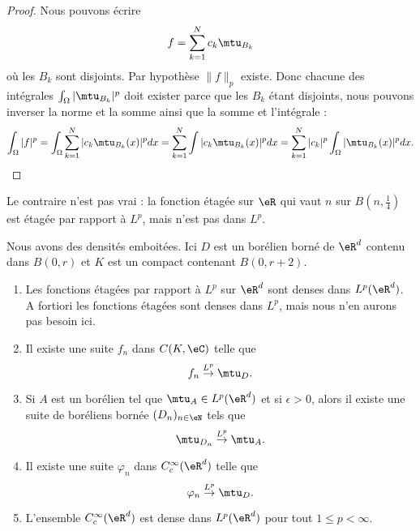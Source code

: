 \begin{proof}
    Nous pouvons écrire
    \begin{equation}
        f=\sum_{k=1}^Nc_k\mtu_{B_k}
    \end{equation}
    où les \( B_k\) sont disjoints. Par hypothèse \( \| f \|_p\) existe. Donc chacune des intégrales \( \int_{\Omega}| \mtu_{B_k} |^p\) doit exister parce que les \( B_k\) étant disjoints, nous pouvons inverser la norme et la somme ainsi que la somme et l'intégrale :
    \begin{equation}
        \int_{\Omega}|f|^p=\int_{\Omega}\sum_{k=1}^N| c_k\mtu_{B_k}(x) |^pdx=\sum_{k=1}^N\int| c_k\mtu_{B_k}(x) |^pdx=\sum_{k=1}^N| c_k |^p\int_{\Omega}| \mtu_{B_k}(x) |^pdx.
    \end{equation}
\end{proof}
Le contraire n'est pas vrai : la fonction étagée sur \( \eR\) qui vaut \( n\) sur \( B(n,\frac{1}{ 4 })\) est étagée par rapport à \( L^p\), mais n'est pas dans \( L^p\).

\begin{theorem} \label{ThoILGYXhX}
    Nous avons des densités emboitées. Ici \( D\) est un borélien borné de \( \eR^d\) contenu dans \( B(0,r)\) et \( K\) est un compact contenant \( B(0,r+2)\).
    \begin{enumerate}
        \item
            Les fonctions étagées par rapport à \( L^p\) sur \( \eR^d\) sont denses dans \( L^p(\eR^d)\). A fortiori les fonctions étagées sont denses dans \( L^p\), mais nous n'en aurons pas besoin ici.
        \item\label{ItemYVFVrOIii}
            Il existe une suite \( f_n\) dans \(  C(K,\eC)\) telle que 
            \begin{equation}
                f_n\stackrel{L^p}{\to}\mtu_{D}.
            \end{equation}
        \item\label{ItemYVFVrOIiii}
            Si \( A\) est un borélien tel que \( \mtu_A\in L^p(\eR^d)\) et si \( \epsilon>0\), alors il existe une suite de boréliens bornée \( (D_n)_{n\in \eN}\) tels que
            \begin{equation}
                \mtu_{D_n}\stackrel{L^p}{\to}\mtu_A.
            \end{equation}
        \item\label{ItemYVFVrOIiv}
            Il existe une suite \( \varphi_n\) dans \(  C^{\infty}_c(\eR^d)\) telle que 
            \begin{equation}
                \varphi_n\stackrel{L^p}{\to}\mtu_{D}.
            \end{equation}

        \item
            L'ensemble \( C^{\infty}_c(\eR^d)\) est dense dans \( L^p(\eR^d)\) pour tout \( 1\leq p<\infty\).
    \end{enumerate}
\end{theorem}

